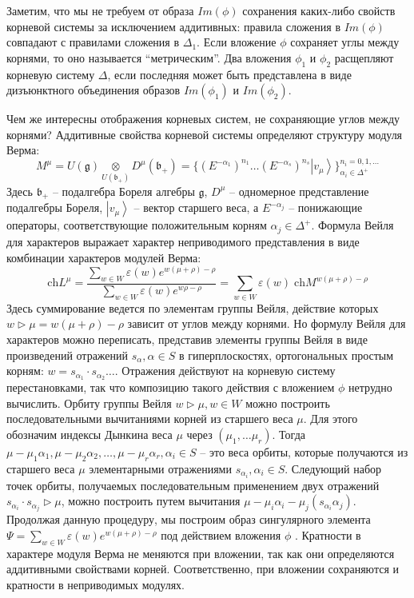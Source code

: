 \documentclass[12pt]{article}
\newcommand{\gf}{\mathfrak{g}}
\newcommand{\bff}{\mathfrak{b}}
\begin{document}
Заметим, что мы не требуем от образа $Im(\phi)$ сохранения каких-либо свойств корневой системы за исключением аддитивных:  
правила сложения в $Im(\phi)$ совпадают с правилами сложения в $\Delta_{1}$. Если вложение
$\phi$ сохраняет углы между корнями, то оно называется ``метрическим''. Два вложения $\phi_1$ и
$\phi_2$ расщепляют корневую систему $\Delta$, если последняя может быть представлена в виде
дизъюнктного объединения образов $Im(\phi_1)$ и $Im(\phi_2)$.

Чем же интересны отображения корневых систем, не сохраняющие углов между корнями? Аддитивные
свойства корневой системы определяют структуру модуля Верма:
    \begin{equation*}
      M^{\mu}=U(\gf)\underset{U(\bff_{+})}{\otimes}
      D^{\mu}(\bff_{+})=\{(E^{-\alpha_{1}})^{n_{1}}\dots (E^{-\alpha_{s}})^{n_{s}}
      \left|v_{\mu}\right>\}_{\alpha_{i}\in\Delta^{+}}^{n_{i}=0,1,\dots} 
    \end{equation*}
Здесь $\bff_{+}$ -- подалгебра Бореля алгебры $\gf$, $D^{\mu}$ -- одномерное представление
подалгебры Бореля, $\left|v_{\mu}\right>$ -- вектор старшего веса, а  $E^{-\alpha_{j}}$ --
понижающие операторы, соответствующие положительным корням $\alpha_{j}\in \Delta^{+}$. 
Формула Вейля для характеров выражает характер неприводимого представления в виде комбинации характеров
модулей Верма: 
\begin{equation*}
  \mathrm{ch} L^{\mu}=\frac{\sum_{w\in W} \varepsilon(w) e^{w(\mu+\rho)-\rho}}{\sum_{w\in W}\varepsilon(w) e^{w\rho-\rho}}=\sum_{w\in W} \varepsilon(w)\; \mathrm{ch} M^{w(\mu+\rho)-\rho}
\end{equation*}
Здесь суммирование ведется по элементам группы Вейля, действие которых $w\triangleright \mu
=w(\mu+\rho)-\rho$ зависит от углов между корнями. Но формулу Вейля для характеров можно переписать,
представив элементы группы Вейля в виде произведений отражений $s_{\alpha}, \alpha \in S$ в
гиперплоскостях, ортогональных простым корням: $w=s_{\alpha_{1}}\cdot s_{\alpha_{2}}\dots$.
Отражения действуют на корневую систему перестановками, так что композицию такого действия с
вложением $\phi$ нетрудно вычислить. Орбиту группы Вейля ${w\triangleright \mu, w\in W}$ можно
построить последовательными вычитаниями корней из старшего веса $\mu$. Для этого обозначим индексы
Дынкина веса $\mu$ через $(\mu_{1},\dots \mu_{r})$. Тогда $\mu-\mu_{1}\alpha_{1},
\mu-\mu_{2}\alpha_{2},\dots, \mu-\mu_{r}\alpha_{r}, \alpha_{i}\in S$ -- это веса орбиты, которые
получаются из старшего веса $\mu$ элементарными отражениями $s_{\alpha_{i}}, \alpha_{i}\in S$.
Следующий набор точек орбиты, получаемых последовательным применением двух отражений
$s_{\alpha_{i}}\cdot s_{\alpha_{j}}\triangleright\mu$, можно построить путем вычитания
$\mu-\mu_{i}\alpha_{i}-\mu_{j} (s_{\alpha_{i}}\alpha_{j})$. Продолжая данную процедуру, мы построим
образ сингулярного элемента $\Psi=\sum_{w\in W} \varepsilon(w) e^{w(\mu+\rho)-\rho}$ под действием
вложения $\phi$ \cite{2011arXiv1111.6787L}. Кратности в характере модуля Верма не меняются при
вложении, так как они определяются аддитивными свойствами корней. Соответственно, при вложении
сохраняются и кратности в неприводимых модулях.
\end{document}
